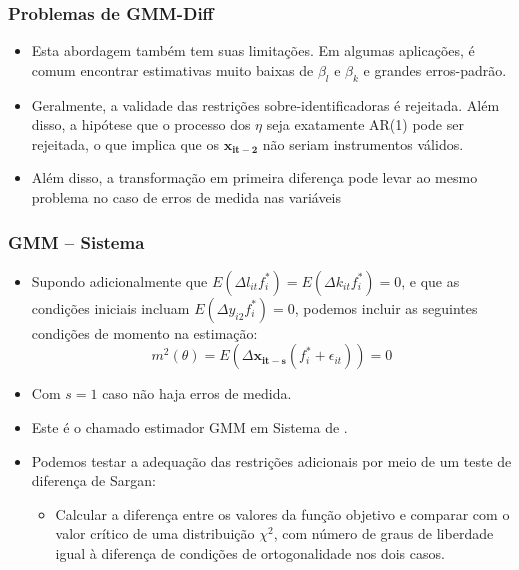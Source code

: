 \documentclass{beamer}
\begin{document}
\begin{frame}\frametitle{Problemas de GMM-Diff}

\begin{itemize}
\item Esta abordagem também tem suas limitações. Em algumas aplicações,
é comum encontrar estimativas muito baixas de $\beta_{l}$ e $\beta_{k}$
e grandes erros-padrão.
\item Geralmente, a validade das restrições sobre-identificadoras é rejeitada.
Além disso, a hipótese que o processo dos $\eta$ seja exatamente
AR(1) pode ser rejeitada, o que implica que os $\mathbf{x_{it-2}}$
não seriam instrumentos válidos.
\item Além disso, a transformação em primeira diferença pode levar ao mesmo
problema no caso de erros de medida nas variáveis
\end{itemize}
\end{frame}

\begin{frame}\frametitle{GMM -- Sistema}

\begin{itemize}
\item Supondo adicionalmente que $E(\Delta l_{it}f_{i}^{*})=E(\Delta k_{it}f_{i}^{*})=0$,
e que as condições iniciais incluam $E(\Delta y_{i2}f_{i}^{*})=0$,
podemos incluir as seguintes condições de momento na estimação:
\[
m^{2}(\theta)=E(\Delta\mathbf{x_{it-s}}(f_{i}^{*}+\epsilon_{it}))=0
\]
\item Com $s=1$ caso não haja erros de medida.
\item Este é o chamado estimador GMM em Sistema de \citet{Blundell1998}.
\item Podemos testar a adequação das restrições adicionais por meio de um
teste de diferença de Sargan:

\begin{itemize}
\item Calcular a diferença entre os valores da função objetivo e comparar
com o valor crítico de uma distribuição $\chi^{2}$, com número de
graus de liberdade igual à diferença de condições de ortogonalidade
nos dois casos.
\end{itemize}
\end{itemize}
\end{frame}

\begin{frame}[allowframebreaks]



\end{frame}

\end{document}
